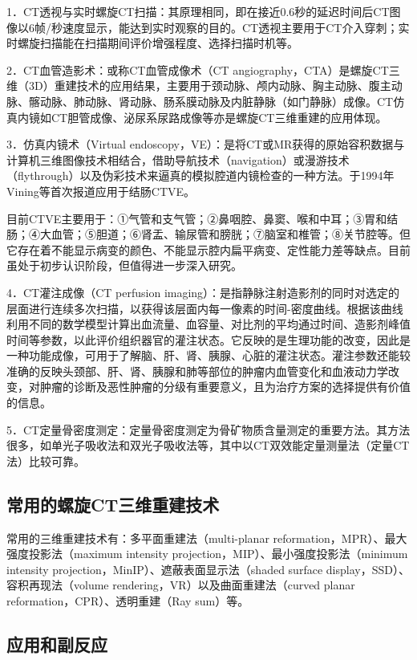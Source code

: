 1．CT透视与实时螺旋CT扫描：其原理相同，即在接近0.6秒的延迟时间后CT图像以6帧/秒速度显示，能达到实时观察的目的。CT透视主要用于CT介入穿刺；实时螺旋扫描能在扫描期间评价增强程度、选择扫描时机等。

2．CT血管造影术：或称CT血管成像术（CT
angiography，CTA）是螺旋CT三维（3D）重建技术的应用结果，主要用于颈动脉、颅内动脉、胸主动脉、腹主动脉、髂动脉、肺动脉、肾动脉、肠系膜动脉及内脏静脉（如门静脉）成像。CT仿真内镜如CT胆管成像、泌尿系尿路成像等亦是螺旋CT三维重建的应用体现。

3．仿真内镜术（Virtual
endoscopy，VE）：是将CT或MR获得的原始容积数据与计算机三维图像技术相结合，借助导航技术（navigation）或漫游技术（flythrough）以及伪彩技术来逼真的模拟腔道内镜检查的一种方法。于1994年Vining等首次报道应用于结肠CTVE。

目前CTVE主要用于：①气管和支气管；②鼻咽腔、鼻窦、喉和中耳；③胃和结肠；④大血管；⑤胆道；⑥肾盂、输尿管和膀胱；⑦脑室和椎管；⑧关节腔等。但它存在着不能显示病变的颜色、不能显示腔内扁平病变、定性能力差等缺点。目前虽处于初步认识阶段，但值得进一步深入研究。

4．CT灌注成像（CT perfusion
imaging）：是指静脉注射造影剂的同时对选定的层面进行连续多次扫描，以获得该层面内每一像素的时间-密度曲线。根据该曲线利用不同的数学模型计算出血流量、血容量、对比剂的平均通过时间、造影剂峰值时间等参数，以此评价组织器官的灌注状态。它反映的是生理功能的改变，因此是一种功能成像，可用于了解脑、肝、肾、胰腺、心脏的灌注状态。灌注参数还能较准确的反映头颈部、肝、肾、胰腺和肺等部位的肿瘤内血管变化和血液动力学改变，对肿瘤的诊断及恶性肿瘤的分级有重要意义，且为治疗方案的选择提供有价值的信息。

5．CT定量骨密度测定：定量骨密度测定为骨矿物质含量测定的重要方法。其方法很多，如单光子吸收法和双光子吸收法等，其中以CT双效能定量测量法（定量CT法）比较可靠。

\subsection{常用的螺旋CT三维重建技术}

常用的三维重建技术有：多平面重建法（multi-planar
reformation，MPR）、最大强度投影法（maximum intensity
projection，MIP）、最小强度投影法（minimum intensity
projection，MinIP）、遮蔽表面显示法（shaded surface
display，SSD）、容积再现法（volume rendering，VR）以及曲面重建法（curved
planar reformation，CPR）、透明重建（Ray sum）等。

\subsection{应用和副反应}

